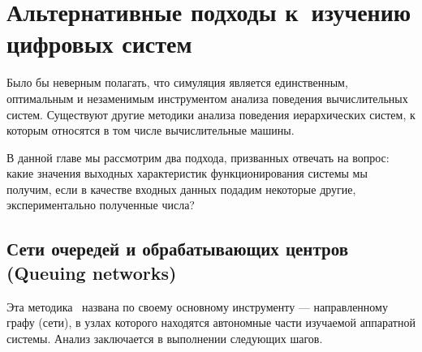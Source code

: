 \chapter[Альтернативы симуляции]{Альтернативные подходы к~изучению цифровых систем}\label{chapter06}



Было бы неверным полагать, что симуляция является единственным, оптимальным и незаменимым инструментом анализа поведения вычислительных систем. Существуют другие методики анализа поведения иерархических систем, к которым относятся  в том числе вычислительные машины. 

В данной главе мы рассмотрим два подхода, призванных отвечать на вопрос: какие значения выходных характеристик функционирования системы мы получим, если в качестве входных данных подадим некоторые другие, экспериментально полученные числа? 

\section[Сети очередей и обрабатывающих центров]{Сети очередей и обрабатывающих центров (Queuing networks)}

Эта методика~\cite{qsp} названа по своему основному инструменту --- направленному графу (сети), в узлах которого находятся автономные части изучаемой аппаратной системы. Анализ заключается в выполнении следующих шагов.

